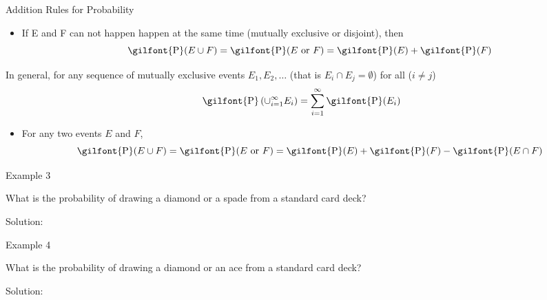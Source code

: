 \documentclass[
  ignorenonframetext,
]{beamer}
\providecommand{\tightlist}{%
  \setlength{\itemsep}{0pt}\setlength{\parskip}{0pt}}
\begin{document}
\begin{frame}{Addition Rules for Probability}
\protect\hypertarget{addition-rules-for-probability}{}
\begin{itemize}
\tightlist
\item
  If E and F can not happen happen at the same time (mutually exclusive
  or disjoint), then
  \[\textrm{\gilfont{P}}\normalfont (E \cup F)=\textrm{\gilfont{P}}\normalfont (E \text{ or } F) = \textrm{\gilfont{P}}\normalfont (E)+ \textrm{\gilfont{P}}\normalfont (F)\]
\end{itemize}

In general, for any sequence of mutually exclusive events
\(E_1, E_2, \ldots\) (that is \(E_i \cap E_j = \emptyset\)) for all
(\(i\neq j\))
\[\textrm{\gilfont{P}}\normalfont \left(\cup_{i=1}^{\infty} E_i\right)=\sum_{i=1}^{\infty} \textrm{\gilfont{P}}\normalfont (E_i)\]

\begin{itemize}
\tightlist
\item
  For any two events \(E\) and \(F\),
  \[\textrm{\gilfont{P}}\normalfont (E \cup F)=\textrm{\gilfont{P}}\normalfont (E \text{ or } F)=\textrm{\gilfont{P}}\normalfont (E)+ \textrm{\gilfont{P}}\normalfont (F)-\textrm{\gilfont{P}}\normalfont (E\cap F)\]
\end{itemize}
\end{frame}

\begin{frame}{Example 3}
\protect\hypertarget{example-3}{}
\begin{tcolorbox}
What is the probability of drawing a diamond or a spade from a standard card deck?
\end{tcolorbox}

\begin{tcolorbox}
Solution:

\vspace{30mm}
\end{tcolorbox}
\end{frame}

\begin{frame}{Example 4}
\protect\hypertarget{example-4}{}
\begin{tcolorbox}
What is the probability of drawing a diamond or an ace from a standard card deck?
\end{tcolorbox}

\begin{tcolorbox}
Solution:

\vspace{30mm}
\end{tcolorbox}
\end{frame}
\end{document}
